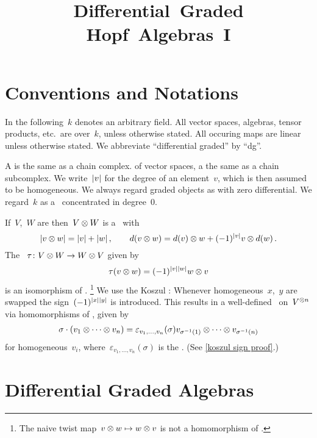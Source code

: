 \documentclass[a4paper,10pt,headings=standardclasses]{scrartcl}
\title{Differential~Graded \\ Hopf~Algebras~I}
\author{}
\date{}
\begin{document}
\maketitle

\vspace{-4em}





\section{Conventions and Notations}
\label{notions and notations}

In the following~$k$ denotes an arbitrary field.
All vector spaces, algebras, tensor products, etc.\ are over~$k$, unless otherwise stated.
All occuring maps are linear unless otherwise stated.
We abbreviate \enquote{differential graded} by \enquote{dg}.

A  is the same as a chain complex.
of vector spaces, a  the same as a chain subcomplex.
We write~$\lvert v\rvert$ for the degree of an element~$v$, which is then assumed to be homogeneous.
We always regard graded objects as {\dgos} with zero differential.
We regard~$k$ as a~{\dgv} concentrated in degree~$0$.

If~$V$,~$W$ are {\dgvs} then~$V \otimes W$ is a {\dgv}~with
\[
  \lvert v \otimes w\rvert
  =
  \lvert v\rvert + \lvert w\rvert \,,
  \qquad
  d(v \otimes w)
  =
  d(v) \otimes w + (-1)^{\lvert v\rvert} v \otimes d(w) \,.
\]
The ~$\tau \colon V \otimes W \to W \otimes V$ given by
\[
  \tau(v \otimes w)
  =
  (-1)^{\lvert v\rvert \lvert w\rvert}
  w \otimes v
\]
is an isomorphism of {\dgvs}.%
\footnote{The naive twist map~$v \otimes w \mapsto w \otimes v$ is not a homomorphism of {\dgvs}.}
We use the Koszul :
Whenever homogeneous~$x$,~$y$ are swapped the sign~$(-1)^{\lvert x\rvert \lvert y\rvert}$ is introduced.
This results in a well-defined~{} on~$V^{\otimes n}$ via homomorphisms of {\dgvs}, given by
\begin{gather*}
  \sigma \cdot (v_1 \otimes \dotsb \otimes v_n)
  =
  \varepsilon_{v_1, \dotsc, v_n}(\sigma)
  v_{\sigma^{-1}(1)} \otimes \dotsb \otimes v_{\sigma^{-1}(n)}
\end{gather*}
for homogeneous~$v_i$, where~$\varepsilon_{v_1, \dotsc, v_n}(\sigma)$ is the .
(See \cref{koszul sign proof}.)





\section{Differential Graded Algebras}
\end{document}
